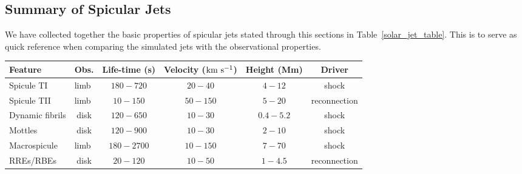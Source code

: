 \subsection{Summary of Spicular Jets}
\label{subsec:jet_table}
We have collected together the basic properties of spicular jets stated through this sections in Table~\ref{solar_jet_table}. This is to serve as quick reference when comparing the simulated jets with the observational properties.  
\begin{landscape}%
\begin{table*}
\caption{Values based on cited papers throughout Section~\ref{sec:spicule-jets}}
\label{solar_jet_table}
\begin{center}
\begin{tabular}{|l|l|l|l|l|p{1.7cm}|}
\hline
\textbf{Feature} & \multicolumn{1}{c|}{\textbf{Obs.}} & \multicolumn{1}{c|}{\textbf{Life-time (s)}} & \multicolumn{1}{c|}{\textbf{Velocity ($\rm{km \ s^{-1}}$)}} & \multicolumn{1}{c|}{\textbf{Height (Mm)}} & \multicolumn{1}{c|}{\textbf{Driver}} \\ \hline

Spicule TI  & limb &   \multicolumn{1}{c|}{$180-720$} & \multicolumn{1}{c|}{$20-40$} &  \multicolumn{1}{c|}{$4-12$}  & \multicolumn{1}{c|}{shock} \\ \hline

Spicule TII & limb & \multicolumn{1}{c|}{$ 10-150$} & \multicolumn{1}{c|}{$ 50-150$} & \multicolumn{1}{c|}{$5-20$}  & \multicolumn{1}{c|}{reconnection}  \\ \hline

Dynamic fibrils & \multicolumn{1}{c|}{disk} & \multicolumn{1}{c|}{$120-650$} & \multicolumn{1}{c|}{$10-30$} & \multicolumn{1}{c|}{$0.4-5.2$} & \multicolumn{1}{c|}{shock} \\ \hline

Mottles & \multicolumn{1}{c|}{disk} & \multicolumn{1}{c|}{$120-900$} & \multicolumn{1}{c|}{$10-30$} & \multicolumn{1}{c|}{$2-10$} & \multicolumn{1}{c|}{shock} \\ \hline

Macrospicule & limb  & \multicolumn{1}{c|}{$180-2700$} & \multicolumn{1}{c|}{$10-150$}  & \multicolumn{1}{c|}{$7-70$} & \multicolumn{1}{c|}{shock} \\ \hline

RREs/RBEs & \multicolumn{1}{c|}{disk}  & \multicolumn{1}{c|}{$20-120$} & \multicolumn{1}{c|}{$10-50$}  & \multicolumn{1}{c|}{$1-4.5$} & \multicolumn{1}{c|}{reconnection} \\ \hline
\end{tabular}
\end{center}
\end{table*}
\end{landscape}
